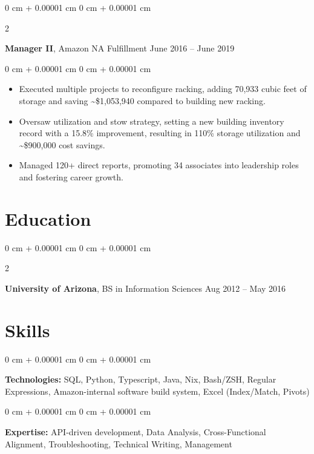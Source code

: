 \documentclass[10pt, letterpaper]{article}
\newenvironment{highlights}{
    \begin{itemize}[
        topsep=0.10 cm,
        parsep=0.10 cm,
        partopsep=0pt,
        itemsep=0pt,
        leftmargin=0 cm + 10pt
    ]
}{
    \end{itemize}
} %
\newenvironment{onecolentry}{
    \begin{adjustwidth}{
        0 cm + 0.00001 cm
    }{
        0 cm + 0.00001 cm
    }
}{
    \end{adjustwidth}
} %
\newenvironment{twocolentry}[2][]{
    \onecolentry
    \def\secondColumn{#2}
    \setcolumnwidth{\fill, 4.5 cm}
    \begin{paracol}{2}
}{
    \switchcolumn \raggedleft \secondColumn
    \end{paracol}
    \endonecolentry
} %
\begin{document}
        \vspace{0.2 cm}

        \begin{twocolentry}{
            June 2016 – June 2019
        }
            \textbf{Manager II}, Amazon NA Fulfillment\end{twocolentry}

        \vspace{0.10 cm}
        \begin{onecolentry}
            \begin{highlights}
                \item Executed multiple projects to reconfigure racking, adding 70,933 cubic feet of storage and saving \textasciitilde{}\$1,053,940 compared to building new racking.
                \item Oversaw utilization and stow strategy, setting a new building inventory record with a 15.8\% improvement, resulting in 110\% storage utilization and \textasciitilde{}\$900,000 cost savings.
                \item Managed 120+ direct reports, promoting 34 associates into leadership roles and fostering career growth.
            \end{highlights}
        \end{onecolentry}



    
    \section{Education}



        
        \begin{twocolentry}{
            Aug 2012 – May 2016
        }
            \textbf{University of Arizona}, BS in Information Sciences\end{twocolentry}




    
    \section{Skills}



        
        \begin{onecolentry}
            \textbf{Technologies:} SQL, Python, Typescript, Java, Nix, Bash/ZSH, Regular Expressions, Amazon-internal software build system, Excel (Index/Match, Pivots)
        \end{onecolentry}

        \vspace{0.2 cm}

        \begin{onecolentry}
            \textbf{Expertise:} API-driven development, Data Analysis, Cross-Functional Alignment, Troubleshooting, Technical Writing, Management
        \end{onecolentry}


    
\end{document}
